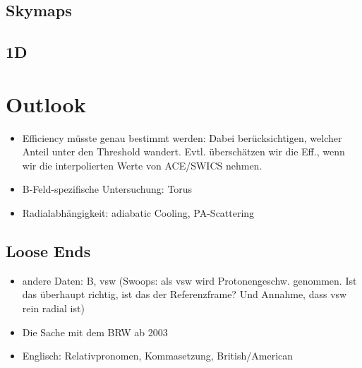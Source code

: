 \subsection{Skymaps}
\subsection{1D}



%
%
%
\section{Outlook}
\begin{itemize}
	\item Efficiency müsste genau bestimmt werden: Dabei berücksichtigen, welcher Anteil unter den Threshold wandert. Evtl. überschätzen wir die Eff., wenn wir die interpolierten Werte von ACE/SWICS nehmen.
	\item B-Feld-spezifische Untersuchung: Torus
	\item Radialabhängigkeit: adiabatic Cooling, PA-Scattering

\end{itemize}







\subsection{Loose Ends}
\begin{itemize}
	\item andere Daten: B, vsw (Swoops: als vsw wird Protonengeschw. genommen. Ist das überhaupt richtig, ist das der Referenzframe? Und Annahme, dass vsw rein radial ist)
	\item Die Sache mit dem BRW ab 2003
	\item Englisch: Relativpronomen, Kommasetzung, British/American
\end{itemize}
